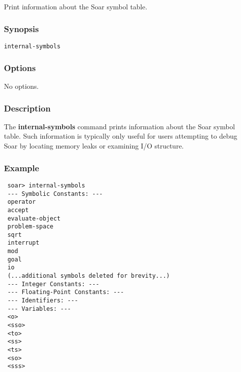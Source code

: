 \subsection{}
\label{internal-symbols}
Print information about the Soar symbol table. 
\subsubsection*{Synopsis}
\begin{verbatim}
internal-symbols
\end{verbatim}
\subsubsection*{Options}
 No options. 
\subsubsection*{Description}
 The \textbf{internal-symbols}
 command prints information about the Soar symbol table. Such information is typically only useful for users attempting to debug Soar by locating memory leaks or examining I/O structure. 
\subsubsection*{Example}
\begin{verbatim}
 soar> internal-symbols
 --- Symbolic Constants: ---
 operator
 accept
 evaluate-object
 problem-space
 sqrt
 interrupt
 mod
 goal
 io
 (...additional symbols deleted for brevity...)
 --- Integer Constants: ---
 --- Floating-Point Constants: ---
 --- Identifiers: ---
 --- Variables: ---  
 <o>
 <sso>
 <to>
 <ss>
 <ts>
 <so>
 <sss>
\end{verbatim}
